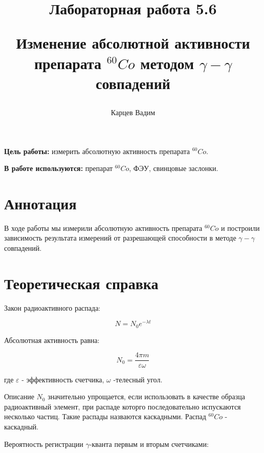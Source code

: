 \documentclass[12pt]{article}
\author{Карцев Вадим}
\title{Лабораторная работа 5.6

Изменение абсолютной активности препарата $^{60}Co$  методом $\gamma - \gamma$
совпадений}
\begin{document}
  \maketitle

  \textbf{Цель работы:} измерить абсолютную активность препарата $^{60}Co$.

  \textbf{В работе используются:} препарат $^{60}Co$, ФЭУ, свинцовые заслонки.

  \section{Аннотация}

    В ходе работы мы измерили абсолютную активность препарата $^{60}Co$ и
    построили зависимость результата измерений от разрешающей способности
    в методе $\gamma - \gamma$ совпадений.


  \newpage
  \section{Теоретическая справка}

    Закон радиоактивного распада:

    $$
      N=N_0e^{-\lambda t}
    $$

    Абсолютная активность равна:

    $$
      N_0=\frac{4\pi m}{\varepsilon \omega}
    $$

    где $\varepsilon$ - эффективность счетчика, $\omega$ -телесный угол.

    Описание $N_0$ значительно упрощается, если использовать в качестве образца
    радиоактивный элемент, при распаде которго последовательно испускаются
    несколько частиц. Такие распады назваются каскадными. Распад $^{60}Co$ -
    каскадный.

    \begin{figure}[h!]
      \begin{minipage}[h]{\linewidth}
      \end{minipage}
      \label{pic:cobalt}
    \end{figure}

    Вероятность регистрации $\gamma$-кванта первым и вторым счетчиками:
\end{document}
